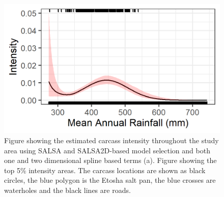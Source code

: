 \documentclass[letterpaper, 12pt]{interact}
\begin{document}
	\begin{figure}[!ht]
		\centering
		\includegraphics[width=\linewidth]{images/Figure8.jpg}
		\caption{Figure showing the estimated carcass intensity throughout the study area using SALSA and SALSA2D-based model selection and both one and two dimensional spline based terms (a). Figure showing the top 5\% intensity areas. The carcass locations are shown as black circles, the blue polygon is the Etosha salt pan, the blue crosses are waterholes and the black lines are roads.}
		\label{fig:mikeoutputs}
	\end{figure}
	
	
	
\end{document}
